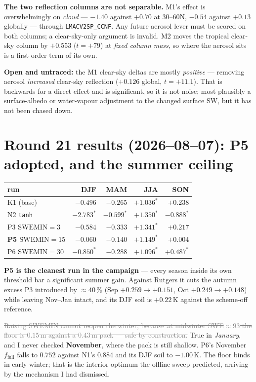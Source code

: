 \documentclass[10pt]{article}
\newcommand{\dead}[1]{\textcolor{gray}{\sout{#1}}}
\begin{document}
\textbf{The two reflection columns are not separable.} M1's effect is overwhelmingly on
\emph{cloud} --- $-1.40$ against $+0.70$ at 30--60N, $-0.54$ against $+0.13$ globally ---
through \texttt{LMACV2SP\_CCNF}. Any future aerosol lever must be scored on both columns; a
clear-sky-only argument is invalid. M2 moves the tropical clear-sky column by $+0.553$
($t=+79$) at \emph{fixed column mass}, so where the aerosol sits is a first-order term of
its own.

\textbf{Open and untraced:} the M1 clear-sky deltas are mostly \emph{positive} --- removing
aerosol \emph{increased} clear-sky reflection ($+0.126$ global, $t=+11.1$). That is backwards
for a direct effect and is significant, so it is not noise; most plausibly a surface-albedo
or water-vapour adjustment to the changed surface SW, but it has not been chased down.

\section{Round 21 results (2026--08--07): P5 adopted, and the summer ceiling}\label{sec:r21res}
\begin{center}\footnotesize
\begin{tabular}{l r r r r}
\toprule
run & DJF & MAM & JJA & SON \\
\midrule
K1 (base) & $-0.496$ & $-0.265$ & $+1.036^*$ & $+0.238$ \\
N2 \texttt{tanh} & $-2.783^*$ & $-0.599^*$ & $+1.350^*$ & $-0.888^*$ \\
P3 $\mathrm{SWEMIN}=3$ & $-0.584$ & $-0.333$ & $+1.341^*$ & $+0.217$ \\
\textbf{P5 $\mathrm{SWEMIN}=15$} & $\mathbf{-0.060}$ & $\mathbf{-0.140}$ & $\mathbf{+1.149^*}$ & $\mathbf{+0.004}$ \\
P6 $\mathrm{SWEMIN}=30$ & $\mathbf{-0.850^*}$ & $-0.288$ & $+1.096^*$ & $\mathbf{+0.487^*}$ \\
\bottomrule
\end{tabular}
\end{center}

\noindent \textbf{P5 is the cleanest run in the campaign} --- every season inside its own
threshold bar a significant summer gain. Against Rutgers it cuts the autumn excess P3
introduced by ${\approx}40\,\%$ (Sep $+0.259\to+0.151$, Oct $+0.249\to+0.148$) while leaving
Nov--Jan intact, and its DJF soil is $+0.22$\,K against the scheme-off reference.

\dead{Raising SWEMIN cannot reopen the winter, because at midwinter SWE${\approx}93$ the floor
is $0.15$\,m against a $0.43$\,m pack --- safe by construction.} True in \emph{January}, and I
never checked \textbf{November}, where the pack is still shallow. P6's November
$f_{\text{full}}$ falls to $0.752$ against N1's $0.884$ and its DJF soil to $-1.00$\,K. The
floor binds in early winter; that is the interior optimum the offline sweep predicted,
arriving by the mechanism I had dismissed.
\end{document}
